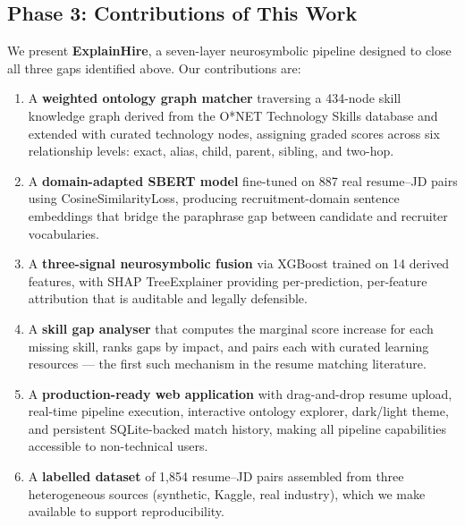 \documentclass[conference]{IEEEtran}
\begin{document}
\subsection{Phase 3: Contributions of This Work}

We present \textbf{ExplainHire}, a seven-layer neurosymbolic pipeline
designed to close all three gaps identified above. Our contributions are:

\begin{enumerate}
  \item A \textbf{weighted ontology graph matcher} traversing a 434-node
        skill knowledge graph derived from the O*NET Technology Skills
        database and extended with curated technology nodes, assigning
        graded scores across six relationship levels: exact, alias, child,
        parent, sibling, and two-hop.

  \item A \textbf{domain-adapted SBERT model} fine-tuned on 887 real
        resume--JD pairs using CosineSimilarityLoss, producing
        recruitment-domain sentence embeddings that bridge the
        paraphrase gap between candidate and recruiter vocabularies.

  \item A \textbf{three-signal neurosymbolic fusion} via XGBoost trained
        on 14 derived features, with SHAP TreeExplainer providing
        per-prediction, per-feature attribution that is auditable and
        legally defensible.

  \item A \textbf{skill gap analyser} that computes the marginal score
        increase for each missing skill, ranks gaps by impact, and pairs
        each with curated learning resources --- the first such mechanism
        in the resume matching literature.

  \item A \textbf{production-ready web application} with drag-and-drop
        resume upload, real-time pipeline execution, interactive ontology
        explorer, dark/light theme, and persistent SQLite-backed match
        history, making all pipeline capabilities accessible to
        non-technical users.

  \item A \textbf{labelled dataset} of 1,854 resume--JD pairs assembled
        from three heterogeneous sources (synthetic, Kaggle, real
        industry), which we make available to support reproducibility.
\end{enumerate}
\end{document}
